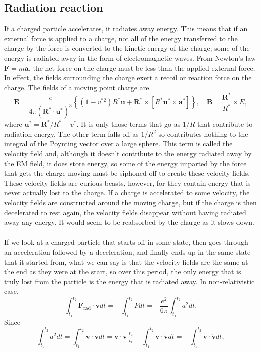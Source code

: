 \subsection{Radiation reaction}
If a charged particle accelerates, it radiates away energy. This means that if an external force is applied to a charge, not all of the energy transferred to the charge by the force is converted to the kinetic energy of the charge; some of the energy is radiated away in the form of electromagnetic waves.  From Newton's law $\bm{F}=m\bm{a}$, the net force on the charge must be less than the applied external force. In effect, the fields surrounding the charge exert a recoil or reaction force on the charge.
The fields of a moving point charge are
\[\bm{E} = \frac{e}{4\pi(\bm{R}^*\cdot\bm{u}^*)^3}\left\{(1-v^{*2})R^*\bm{u} + \bm{R}^* \times [R^*\bm{u}^* \times \bm{a}^*]\right\} , \quad \bm{B} = \frac{\bm{R}^*}{R^*}\times E,\]
where $\bm{u}^* = {\bm{R}^*}/{R^*}-v^*$.
It is only those terms that go as ${1}/{R}$ that contribute to radiation energy. The other term falls off as ${1}/{R^2}$ so contributes nothing to the integral of the Poynting vector over a large sphere. This term is called the velocity field and, although it doesn't contribute to the energy radiated away by the EM field, it does store energy, so some of the energy imparted by the force that gets the charge moving must be siphoned off to create these velocity fields. These velocity fields are curious beasts, however, for they contain energy that is never actually lost to the charge. If a charge is accelerated to some velocity, the velocity fields are constructed around the moving charge, but if the charge is then decelerated to rest again, the velocity fields disappear without having radiated away any energy. It would seem to be reabsorbed by the charge as it slows down. 
\\ \\
If we look at a charged particle that starts off in some state, then goes through an acceleration followed by a deceleration, and finally ends up in the same state that it started from, what we can say is that the velocity fields are the same at the end as they were at the start, so over this period, the only energy that is truly lost from the particle is the energy that is radiated away. In non-relativistic case,
\[\int_{t_{1}}^{t_{2}}\bm{F}_{\mathrm{rad}}\cdot\bm{v}dt = -\int_{t_{1}}^{t_{2}}Pdt = -\frac{e^{2}}{6\pi }\int_{t_{1}}^{t_{2}}a^{2}dt .\]
Since
\[\int_{t_{1}}^{t_{2}}a^{2}dt = \int_{t_{1}}^{t_{2}}\dot{\bm{v}}\cdot\dot{\bm{v}}dt = \bm{v}\cdot\dot{\bm{v}}|_{t_{1}}^{t_{2}}-\int_{t_{1}}^{t_{2}}\bm{v} \cdot\ddot{\bm{v}}dt = -\int_{t_{1}}^{t_{2}}\bm{v} \cdot\ddot{\bm{v}}dt,\]
